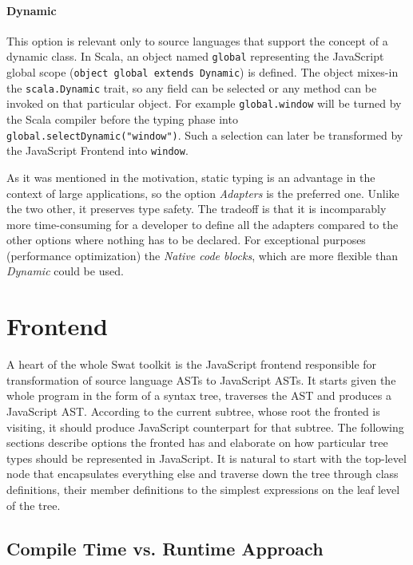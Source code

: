 \documentclass[12pt,a4paper]{report}
\begin{document}
\paragraph{Dynamic} This option is relevant only to source languages that support the concept of a dynamic class. In Scala, an object named \texttt{global} representing the JavaScript global scope (\texttt{object global extends Dynamic}) is defined. The object mixes-in the \texttt{scala.Dynamic} \cite{ScalaDynamic} trait, so any field can be selected or any method can be invoked on that particular object. For example \texttt{global.window} will be turned by the Scala compiler before the typing phase into \texttt{global.selectDynamic("window")}. Such a selection can later be transformed by the JavaScript Frontend into \texttt{window}.

As it was mentioned in the motivation, static typing is an advantage in the context of large applications, so the option {\it Adapters} is the preferred one. Unlike the two other, it preserves type safety. The tradeoff is that it is incomparably more time-consuming for a developer to define all the adapters compared to the other options where nothing has to be declared. For exceptional purposes (performance optimization) the {\it Native code blocks}, which are more flexible than {\it Dynamic} could be used.

\section{Frontend}

A heart of the whole Swat toolkit is the JavaScript frontend responsible for transformation of source language ASTs to JavaScript ASTs. It starts given the whole program in the form of a syntax tree, traverses the AST and produces a JavaScript AST. According to the current subtree, whose root the fronted is visiting, it should produce JavaScript counterpart for that subtree. The following sections describe options the fronted has and elaborate on how particular tree types should be represented in JavaScript. It is natural to start with the top-level node that encapsulates everything else and traverse down the tree through class definitions, their member definitions to the simplest expressions on the leaf level of the tree.

\subsection{Compile Time vs. Runtime Approach}
\end{document}

